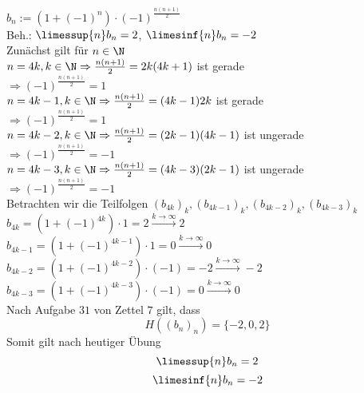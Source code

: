 \documentclass[12pt,a4paper,titlepage,draft]{article}
\begin{document}
	\begin{bsp}
		\(b_n := (1 + (-1)^n) \cdot (-1)^{\frac{n(n+1)}{2}} \)\\
		Beh.: \(\limessup{n} b_n = 2\), \(\limesinf{n} b_n = -2\)\\
		Zunächst gilt für \(n \in \N\)\\
		\(n = 4k, k \in \N \Rightarrow \frac{n(n+1)}{2} = 2k(4k+1)\) ist gerade\\
		\(\Rightarrow (-1)^{\frac{n(n+1)}{2}} = 1\)\\
		\(n = 4k - 1, k \in \N \Rightarrow \frac{n(n+1)}{2} = (4k-1)2k\) ist gerade\\
		\(\Rightarrow (-1)^{\frac{n(n+1)}{2}} = 1\)\\
		\(n = 4k - 2, k \in \N \Rightarrow \frac{n(n+1)}{2} = (2k-1)(4k-1)\) ist ungerade\\
		\(\Rightarrow (-1)^{\frac{n(n+1)}{2}} = -1\)\\
		\(n = 4k - 3, k \in \N \Rightarrow \frac{n(n+1)}{2} = (4k-3)(2k-1)\) ist ungerade\\
		\(\Rightarrow (-1)^{\frac{n(n+1)}{2}} = -1\)\\
		Betrachten wir die Teilfolgen \((b_{4k})_k, (b_{4k-1})_k, (b_{4k-2})_k, (b_{4k-3})_k\)\\
		\(b_{4k} = (1 + (-1)^{4k}) \cdot 1 = 2 \overset{k \rightarrow \infty}{\rightarrow} 2\)\\
		\(b_{4k-1} = (1 + (-1)^{4k-1}) \cdot 1 = 0 \overset{k \rightarrow \infty}{\rightarrow} 0\)\\
		\(b_{4k-2} = (1 + (-1)^{4k-2}) \cdot (-1) = -2 \overset{k \rightarrow \infty}{\rightarrow} -2\)\\
		\(b_{4k-3} = (1 + (-1)^{4k-3}) \cdot (-1) = 0 \overset{k \rightarrow \infty}{\rightarrow} 0\)\\
		Nach Aufgabe \(31\) von Zettel \(7\) gilt, dass
		\[H((b_n)_n) = \{-2,0,2\}\]
		Somit gilt nach heutiger Übung\\
		\[\limessup{n} b_n = 2\]
		\[\limesinf{n} b_n = -2\]
	\end{bsp}
\end{document}
